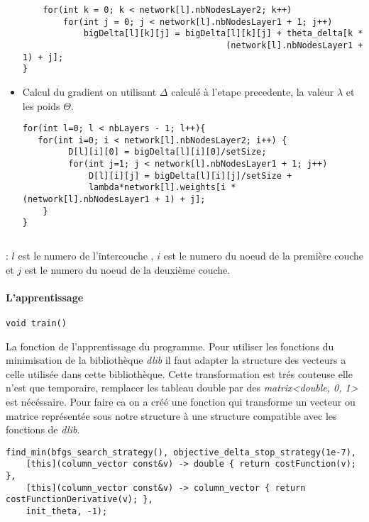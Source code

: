 \begin{itemize}
\begin{verbatim}
	for(int k = 0; k < network[l].nbNodesLayer2; k++)
		for(int j = 0; j < network[l].nbNodesLayer1 + 1; j++)
			bigDelta[l][k][j] = bigDelta[l][k][j] + theta_delta[k *
										(network[l].nbNodesLayer1 + 1) + j];
}
\end{verbatim}
\item Calcul du gradient on utilisant $\Delta$ calculé à l'etape precedente, la valeur $\lambda$ et les poids $\Theta$.
\begin{verbatim}
for(int l=0; l < nbLayers - 1; l++){
   for(int i=0; i < network[l].nbNodesLayer2; i++) {
		 D[l][i][0] = bigDelta[l][i][0]/setSize;
		 for(int j=1; j < network[l].nbNodesLayer1 + 1; j++)
			 D[l][i][j] = bigDelta[l][i][j]/setSize +
			 lambda*network[l].weights[i * (network[l].nbNodesLayer1 + 1) + j];
	}
}
\end{verbatim}
\end{itemize}
\begin{verbatim}

\end{verbatim}
 : $l$ est le numero de l'intercouche , $i$ est le numero du noeud de la première couche et $j$ est le numero du noeud de la deuxième couche.

\newpage
\paragraph{L'apprentissage}
\begin{verbatim}
void train()
\end{verbatim}
La fonction de l'apprentissage du programme.
Pour utiliser les fonctions du minimisation de la bibliothèque \textit{dlib} il faut adapter la structure des vecteurs a celle utilisée dans cette bibliothèque. Cette transformation est trés couteuse elle n'est que temporaire, remplacer les tableau double par des \textit{matrix<double, 0, 1>} est nécéssaire.
Pour faire ca on a créé une fonction qui transforme un vecteur ou matrice représentée sous notre structure à une structure compatible avec les fonctions de \textit{dlib}.

\begin{verbatim}
find_min(bfgs_search_strategy(), objective_delta_stop_strategy(1e-7),
	[this](column_vector const&v) -> double { return costFunction(v); },
	[this](column_vector const&v) -> column_vector { return costFunctionDerivative(v); },
	init_theta, -1);
\end{verbatim}

